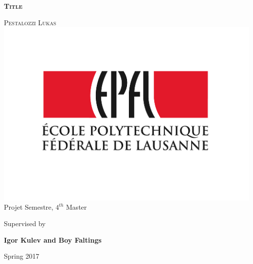 \begin{titlepage}

\thispagestyle{empty}	%

\begin{center}
\vspace*{1.5cm}
\huge\textsc{\textbf{Title}}

\vspace*{1.5cm}
\LARGE\textsc{Pestalozzi Lukas} \\[3cm]

\includegraphics[scale=0.6]{images/epfl.pdf} \\[3cm]


\Large
Projet Semestre, $4^{th}$ Master

\vspace*{1cm}
Supervised by

\vspace*{1cm}
\textbf{Igor Kulev and Boy Faltings}

\vspace*{1cm}
Spring 2017

\end{center}

\vspace{2cm}
\end{titlepage}
